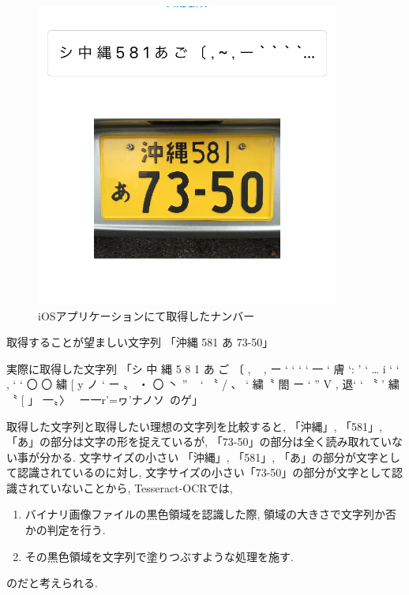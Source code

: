 \begin{figure}
\begin{center}
\includegraphics[width=10cm]{fig/FullSizeRender.jpg}
\end{center}
\caption{iOSアプリケーションにて取得したナンバー}
\end{figure}

\begin{itembox}[l]{取得することが望ましい文字列}
「沖縄 581 あ 73-50」
\end{itembox}

\begin{itembox}[l]{実際に取得した文字列}
「シ 中 縄 5 8 1 あ ご 〔 , ~ , ー ` ` ` ` 一 ` 膚 `: ' ` … i ` ` , ` ` 〇 〇 繍 [ y ノ ` ー 〟 ・ 〇 丶 ” ~ ` 〝 / 、 ` 繍〝 閤 ー ` ” V , 退` ` 〝 ' 繍 〝 [ 」 一〟〉~ ー一r'=ヮ'ナノソ~のゲ」
\end{itembox}

取得した文字列と取得したい理想の文字列を比較すると, 「沖縄」, 「581」, 「あ」の部分は文字の形を捉えているが, 「73-50」の部分は全く読み取れていない事が分かる.
文字サイズの小さい 「沖縄」, 「581」, 「あ」の部分が文字として認識されているのに対し, 文字サイズの小さい「73-50」の部分が文字として認識されていないことから, Tesseract-OCRでは, 
\begin{enumerate}
\item バイナリ画像ファイルの黒色領域を認識した際, 領域の大きさで文字列か否かの判定を行う.
\item その黒色領域を文字列で塗りつぶすような処理を施す.
\end{enumerate}
のだと考えられる.

